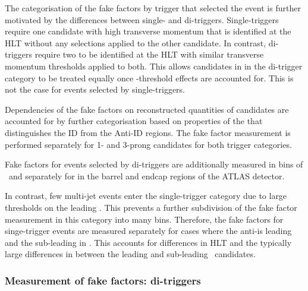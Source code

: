 The categorisation of the fake factors by trigger that selected the
event is further motivated by the differences between single- and
di-\tauhadvis triggers. Single-\tauhadvis triggers require one
\tauhadvis candidate with high transverse momentum that is identified
at the HLT without any selections applied to the other candidate. In
contrast, di-\tauhadvis triggers require two \tauhadvis to be
identified at the HLT with similar transverse momentum thresholds
applied to both. This allows \tauhadvis candidates in in the
di-\tauhadvis trigger category to be treated equally once
\pT-threshold effects are accounted for. This is not the case for
events selected by single-\tauhadvis triggers.

Dependencies of the fake factors on reconstructed quantities of
\tauhadvis candidates are accounted for by further categorisation
based on properties of the \tauhadvis that distinguishes the ID from
the Anti-ID regions. The fake factor measurement is performed
separately for 1- and 3-prong \tauhadvis candidates for both trigger
categories.

Fake factors for events selected by di-\tauhadvis triggers are
additionally measured in bins of \tauhadvis~\pT and separately for
\tauhadvis in the barrel and endcap regions of the ATLAS detector.

In contrast, few multi-jet events enter the single-\tauhadvis trigger
category due to large \pT thresholds on the leading \tauhadvis. This
prevents a further subdivision of the fake factor measurement in this
category into many bins. Therefore, the fake factors for
singe-\tauhadvis trigger events are measured separately for cases
where the anti-\tauhadvis is leading and the sub-leading in \pT. This
accounts for differences in HLT \tauid and the typically large
differences in \pT between the leading and sub-leading
\tauhadvis~candidates.

\subsubsection{Measurement of fake factors: di-\tauhadvis triggers}

